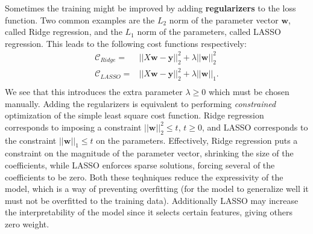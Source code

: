 \documentclass[twoside,english]{uiofysmaster}
\begin{document}
Sometimes the training might be improved by adding \textbf{regularizers} to the loss function. Two common examples are the $L_2$ norm of the parameter vector $\bm{w}$, called Ridge regression, and the $L_1$ norm of the parameters, called LASSO regression. This leads to the following cost functions respectively:
\begin{align}
	\mathcal{C}_{Ridge} =& ||X\mathbf{w} - \mathbf{y}||_2^2 + \lambda || \bm{w}||_2^2 \\
	\mathcal{C}_{LASSO} =& ||X\mathbf{w} - \mathbf{y}||_2^2 + \lambda || \bm{w}||_1 . \\
\end{align}
We see that this introduces the extra parameter $\lambda \geq 0$ which must be chosen manually. Adding the regularizers is equivalent to performing \textit{constrained} optimization of the simple least square cost function. Ridge regression corresponds to imposing a constraint $|| \bm{w}||_2^2 \leq t$, $t\geq 0$, and LASSO corresponds to the constraint $|| \bm{w}||_1 \leq t$ on the parameters. Effectively, Ridge regression puts a constraint on the magnitude of the parameter vector, shrinking the size of the coefficients, while LASSO enforces sparse solutions, forcing several of the coefficients to be zero. Both these teqhniques reduce the expressivity of the model, which is a way of preventing overfitting (for the model to generalize well it must not be overfitted to the training data). Additionally LASSO may increase the interpretability of the model since it selects certain features, giving others zero weight.
\end{document}
